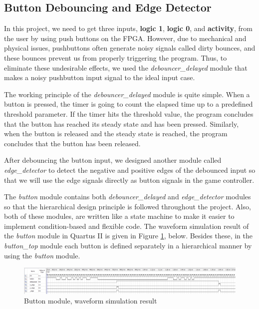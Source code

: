 \documentclass[conference]{IEEEtran}
\begin{document}
\subsection{Button Debouncing and Edge Detector}
In this project, we need to get three inputs, \textbf{logic 1}, \textbf{logic 0}, and \textbf{activity}, from the user by using push buttons on the FPGA. However, due to mechanical and physical issues, pushbuttons often generate noisy signals called dirty bounces, and these bounces prevent us from properly triggering the program. Thus, to eliminate these undesirable effects, we used the \textit{debouncer\_delayed} module that makes a noisy pushbutton input signal to the ideal input case. \\
\par The working principle of the \textit{debouncer\_delayed} module is quite simple. When a button is pressed, the timer is going to count the elapsed time up to a predefined threshold parameter. If the timer hits the threshold value, the program concludes that the button has reached its steady state and has been pressed. Similarly, when the button is released and the steady state is reached, the program concludes that the button has been released. \\
\par After debouncing the button input, we designed another module called \textit{edge\_detector} to detect the negative and positive edges of the debounced input so that we will use the edge signals directly as button signals in the game controller. \\
\par The \textit{button} module contains both \textit{debouncer\_delayed} and \textit{edge\_detector} modules so that the hierarchical design principle is followed throughout the project. Also, both of these modules, are written like a state machine to make it easier to implement condition-based and flexible code. The waveform simulation result of the \textit{button} module in Quartus II is given in Figure \ref{Fig. 1.}, below. Besides these, in the \textit{button\_top} module each button is defined separately in a hierarchical manner by using the \textit{button} module.
 \begin{figure}[H]
   \centerline{\includegraphics[scale=0.22]{simulation.png}}
    \caption{Button module, waveform simulation result}
    \label{Fig. 1.}
\end{figure} 
\end{document}
